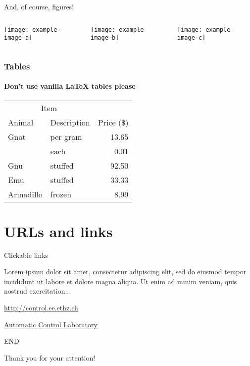 \documentclass[11pt,aspectratio=169]{beamer}
\begin{document}
\begin{frame}{And, of course, figures!}

	\begin{columns}
		\begin{column}{0.33\textwidth}
			\texttt{[image: example-image-a]}
		\end{column}
		\begin{column}{0.33\textwidth}
			\texttt{[image: example-image-b]}
		\end{column}
		\begin{column}{0.33\textwidth}
			\texttt{[image: example-image-c]}
		\end{column}
	\end{columns}

\end{frame}

\begin{frame}

	\frametitle{Tables}
	\framesubtitle{Don't use vanilla \LaTeX{}  tables please}
	
		\begin{center}
			\begin{tabular}{@{}llr@{}}
				\toprule\multicolumn{2}{c}{Item} \\
				\cmidrule(r){1-2}Animal & Description & Price (\$)\\
				\midrule
				Gnat  & per gram  & 13.65 \\
				& each      & 0.01 \\
				Gnu   & stuffed   & 92.50 \\
				Emu   & stuffed   & 33.33 \\
				Armadillo & frozen & 8.99 \\
				\bottomrule
			\end{tabular}
		\end{center}

\end{frame}

\section{URLs and links}

\begin{frame}{Clickable links}

	Lorem ipsum dolor sit amet, consectetur adipiscing elit, sed do eiusmod tempor incididunt ut labore et dolore magna aliqua. 
	Ut enim ad minim veniam, quis nostrud exercitation...
	
	\medskip

	\url{http://control.ee.ethz.ch}
	
	\href{http://control.ee.ethz.ch}{Automatic Control Laboratory}
	

\end{frame}



\begin{frame}[fragile]{END}
    \begin{center}
        \Large{Thank you for your attention!}
    \end{center}
\end{frame}
\end{document}
